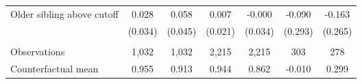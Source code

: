 {{\begin{tabular}{lcccccc}
Older sibling above cutoff&       0.028   &       0.058   &       0.007   &      -0.000   &      -0.090   &      -0.163   \\
                    &     (0.034)   &     (0.045)   &     (0.021)   &     (0.034)   &     (0.293)   &     (0.265)   \\
                    &               &               &               &               &               &               \\
Observations        &       1,032   &       1,032   &       2,215   &       2,215   &         303   &         278   \\
Counterfactual mean &       0.955   &       0.913   &       0.944   &       0.862   &      -0.010   &       0.299   \\
 

\bottomrule
\end{tabular}
}
}
